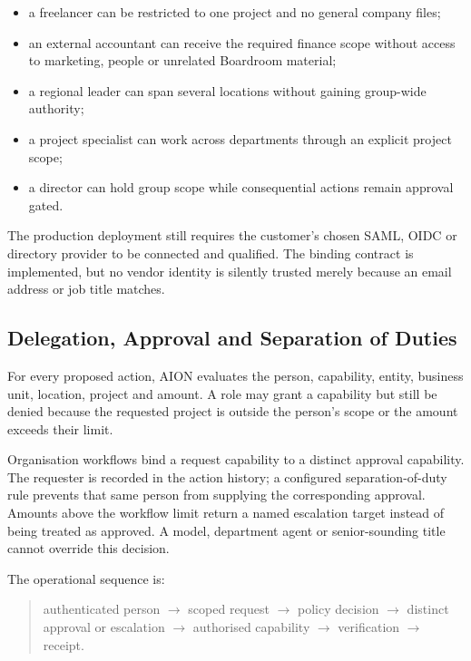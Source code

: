 \begin{itemize}
  \item a freelancer can be restricted to one project and no general company files;
  \item an external accountant can receive the required finance scope without access to
        marketing, people or unrelated Boardroom material;
  \item a regional leader can span several locations without gaining group-wide authority;
  \item a project specialist can work across departments through an explicit project scope;
  \item a director can hold group scope while consequential actions remain approval gated.
\end{itemize}

The production deployment still requires the customer's chosen SAML, OIDC or directory
provider to be connected and qualified.  The binding contract is implemented, but no vendor
identity is silently trusted merely because an email address or job title matches.

\subsection{Delegation, Approval and Separation of Duties}

For every proposed action, AION evaluates the person, capability, entity, business unit,
location, project and amount.  A role may grant a capability but still be denied because the
requested project is outside the person's scope or the amount exceeds their limit.

Organisation workflows bind a request capability to a distinct approval capability.  The
requester is recorded in the action history; a configured separation-of-duty rule prevents
that same person from supplying the corresponding approval.  Amounts above the workflow
limit return a named escalation target instead of being treated as approved.  A model,
department agent or senior-sounding title cannot override this decision.

The operational sequence is:

\begin{quote}
authenticated person $\rightarrow$ scoped request $\rightarrow$ policy decision
$\rightarrow$ distinct approval or escalation $\rightarrow$ authorised capability
$\rightarrow$ verification $\rightarrow$ receipt.
\end{quote}

